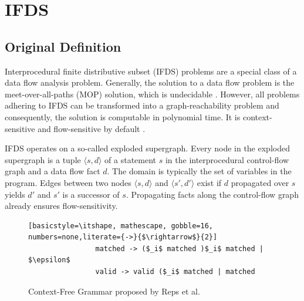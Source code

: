 \documentclass[../draft.tex]{subfiles}
\begin{document}
    \section{IFDS}\label{s:bigifds}
    \subsection{Original Definition}\label{s:ifds}
    Interprocedural finite distributive subset (IFDS) problems are a special class of a data flow analysis problem.
    Generally, the solution to a data flow problem is the meet-over-all-paths (MOP) solution, which is undecidable \cite{Rice1953}.
    However, all problems adhering to IFDS can be transformed into a graph-reachability problem and consequently, the solution is computable in polynomial time.
    It is context-sensitive and flow-sensitive by default \cite{Reps1995}.

    IFDS operates on a so-called exploded supergraph.
    Every node in the exploded supergraph is a tuple $\langle s, d \rangle$ of a statement $s$ in the interprocedural control-flow graph and a data flow fact $d$.
    The domain is typically the set of variables in the program.
    Edges between two nodes $\langle s, d \rangle$ and $\langle s', d' \rangle$ exist if $d$ propagated over $s$ yields $d'$ and $s'$ is a successor of $s$.
    Propagating facts along the control-flow graph already ensures flow-sensitivity.

    \begin{figure}[ht]
        \centering
        \begin{adjustbox}{max width=\columnwidth}
            \begin{lstlisting}[basicstyle=\itshape, mathescape, gobble=16, numbers=none,literate={->}{$\rightarrow$}{2}]
                matched -> ($_i$ matched )$_i$ matched | $\epsilon$
                valid -> valid ($_i$ matched | matched
            \end{lstlisting}
        \end{adjustbox}
        \caption{Context-Free Grammar proposed by Reps et al.\cite{Reps1995}}
        \label{lst:cfl}
    \end{figure}
\end{document}

